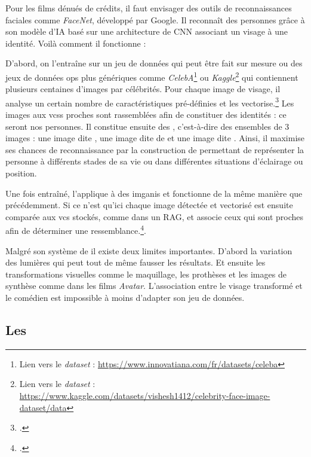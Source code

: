 \label{FaceNet} Pour les films dénués de crédits, il faut envisager des outils de reconnaissances faciales comme \textit{FaceNet}, développé par Google. Il reconnaît des personnes grâce à son modèle d'\gls{IA} basé sur une architecture de \gls{CNN} associant un visage à une identité. Voilà comment il fonctionne : 

D'abord, on l'entraîne sur un jeu de données qui peut être fait sur mesure ou des jeux de données \gls{ops} plus génériques comme \textit{CelebA}\footnote{Lien vers le \textit{dataset} : \url{https://www.innovatiana.com/fr/datasets/celeba}}  ou \textit{Kaggle}\footnote{Lien vers le \textit{dataset} : \url{https://www.kaggle.com/datasets/vishesh1412/celebrity-face-image-dataset/data}} qui contiennent plusieurs centaines d'images par célébrités. Pour chaque image de visage, il analyse un certain nombre de caractéristiques pré-définies et les vectorise.\footcite{schroffFaceNetUnifiedEmbedding2015} Les images aux \glspl{vcs} proches sont rassemblées afin de constituer des identités : ce seront nos personnes. Il constitue ensuite des , c'est-à-dire des ensembles de 3 images : une image dite , une image dite de  et une image dite . Ainsi, il maximise ses chances de reconnaissance par la construction de  permettant de représenter la personne à différents stades de sa vie ou dans différentes situations d'éclairage ou position. 

Une fois entraîné, l'applique à des \glspl{imgani} et fonctionne de la même manière que précédemment. Si ce n'est qu'ici chaque image détectée et vectorisé est ensuite comparée aux \gls{vcs} stockés, comme dans un \gls{RAG}, et associe ceux qui sont proches afin de déterminer une ressemblance.\footcite{schroffFaceNetUnifiedEmbedding2015}.\newline

Malgré son système de  il existe deux limites importantes. D'abord la variation des lumières qui peut tout de même fausser les résultats. Et ensuite les transformations visuelles comme le maquillage, les prothèses et les images de synthèse comme dans les films \textit{Avatar}. L'association entre le visage transformé et le comédien est impossible à moins d'adapter son jeu de données.

\subsection{Les }


